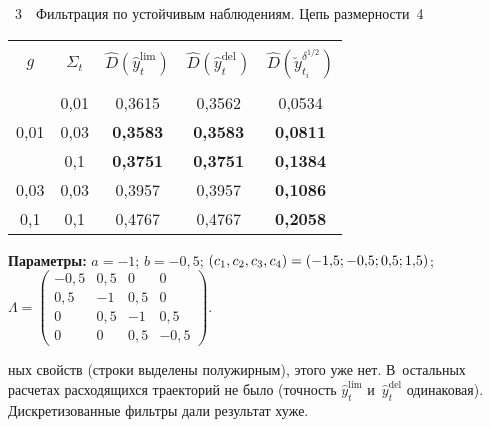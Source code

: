 \begin{multicols}{2}
\begin{center}

\vspace*{12pt}

\parbox{78mm}{{\tablename~3}\ \ \small{Фильтрация по устойчивым наблюдениям. Цепь размерности~4
}}

      \vspace*{6pt}
      
      \tabcolsep=8pt
     {\small  \begin{tabular}{|c|c|c|c|c|}
      \hline
      &&&&\\[-9pt]
$g$& $\Sigma_t$ & $\hat{D}\left(\hat{y}_t^{\mathrm{lim}}\right)$ & $\hat{D}\left(\hat{y}_t^{\mathrm{del}}\right)$&$\hat{D}\left(\breve{y}_{t_i}^{\delta^{1/2}}\right)$\\
&&&&\\[-9pt]
\hline
 &  0{,}01 &0,3615&0,3562&0,0534\\
0,01 & 0{,}03&\textbf{0,3583}&\textbf{0,3583}&\textbf{0,0811}\\
& 0{,}1\hphantom{9}&\textbf{0,3751}&\textbf{0,3751}&\textbf{0,1384}\\
\hline
0{,}03 & 0{,}03&0,3957&0,3957&\textbf{0,1086}\\
\hline
0{,}1\hphantom{9} & 0{,}1\hphantom{9}&0,4767&0,4767&\textbf{0,2058}\\
\hline
\end{tabular}

}

\smallskip

\parbox{78mm}{\footnotesize{\hspace*{5mm}\textbf{Параметры:} $a=-1$; $b=-0{,}5$; $(c_1, c_2, c_3, c_4)\hm=(-1{,}5; -0{,}5; 0{,}5; 1{,}5)$; 
$\Lambda= \begin{pmatrix}
-0{,}5 & 0{,}5& 0&0\\
0{,}5& -1 & 0{,}5& 0\\
0& 0{,}5& -1& 0{,}5\\
0& 0& 0{,}5 & -0{,}5
\end{pmatrix}$.
}}

\end{center}

\vspace*{3pt}



\noindent
 ных свойств (строки выделены полужирным), этого уже нет. В~остальных 
расчетах расходящихся траекторий не было (точ\-ность $\hat{y}_t^{\mathrm{lim}}$ 
и~$\hat{y}_t^{\mathrm{del}}$ одинаковая). Дискретизованные фильт\-ры дали результат 
хуже.








\end{multicols}
